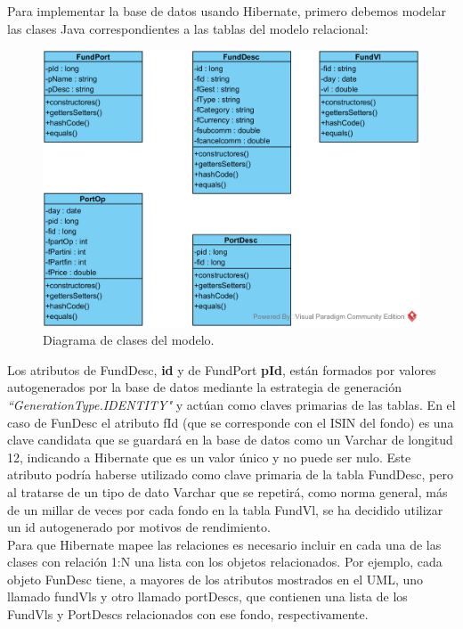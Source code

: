\documentclass[12pt, a4paper]{article}
\begin{document}
Para implementar la base de datos usando Hibernate, primero debemos modelar las clases Java correspondientes a las tablas del modelo relacional:\\

\begin{figure}[htbp]
	\centering
	\includegraphics[width=\textwidth]{figuras/Diagrama_clases.png}
	\caption{Diagrama de clases del modelo.}
	\label{fig:mclases}
	\end {figure}

Los atributos de FundDesc, \textbf{id} y de FundPort \textbf{pId}, están formados por valores autogenerados por la base de datos mediante la estrategia de generación \textit{``GenerationType.IDENTITY"} y actúan como claves primarias de las tablas. En el caso de FunDesc el atributo fId (que se corresponde con el \gls{ISIN} del fondo) es una clave candidata que se guardará en la base de datos como un Varchar de longitud 12, indicando a Hibernate que es un valor único y no puede ser nulo. Este atributo podría haberse utilizado como clave primaria de la tabla FundDesc, pero al tratarse de un tipo de dato Varchar que se repetirá, como norma general, más de un millar de veces por cada fondo en la tabla FundVl, se ha decidido utilizar un id autogenerado por motivos de rendimiento.\\

Para que Hibernate mapee las relaciones es necesario incluir en cada una de las clases con relación 1:N una lista con los objetos relacionados. Por ejemplo, cada objeto FunDesc tiene, a mayores de los atributos mostrados en el \gls{UML}, uno llamado fundVls y otro llamado portDescs, que contienen una lista de los FundVls y PortDescs relacionados con ese fondo, respectivamente.\\
\end{document}

